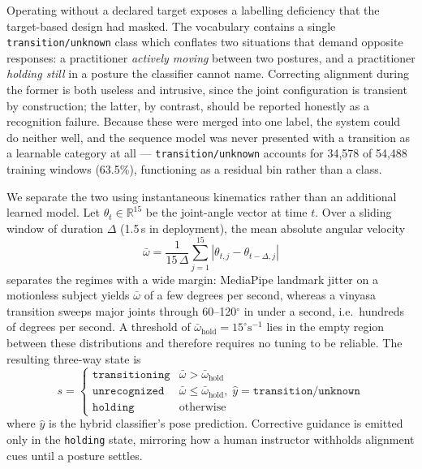 \documentclass[conference]{IEEEtran}
\begin{document}
Operating without a declared target exposes a labelling deficiency that the
target-based design had masked. The vocabulary contains a single
\texttt{transition/unknown} class which conflates two situations that demand
opposite responses: a practitioner \emph{actively moving} between two
postures, and a practitioner \emph{holding still} in a posture the classifier
cannot name. Correcting alignment during the former is both useless and
intrusive, since the joint configuration is transient by construction; the
latter, by contrast, should be reported honestly as a recognition failure.
Because these were merged into one label, the system could do neither well,
and the sequence model was never presented with a transition as a learnable
category at all --- \texttt{transition/unknown} accounts for
34{,}578 of 54{,}488 training windows (63.5\%), functioning as a residual bin
rather than a class.

We separate the two using instantaneous kinematics rather than an additional
learned model. Let $\theta_t \in \mathbb{R}^{15}$ be the joint-angle vector at
time $t$. Over a sliding window of duration $\Delta$ (1.5\,s in deployment),
the mean absolute angular velocity
\begin{equation}
\bar{\omega} = \frac{1}{15\,\Delta} \sum_{j=1}^{15}
\left| \theta_{t,j} - \theta_{t-\Delta,j} \right|
\label{eq:motion}
\end{equation}
separates the regimes with a wide margin: MediaPipe landmark jitter on a
motionless subject yields $\bar{\omega}$ of a few degrees per second, whereas a
vinyasa transition sweeps major joints through 60--120$^\circ$ in under a
second, i.e.\ hundreds of degrees per second. A threshold of
$\bar{\omega}_{\mathrm{hold}} = 15^{\circ}\mathrm{s}^{-1}$ lies in the empty
region between these distributions and therefore requires no tuning to be
reliable. The resulting three-way state is
\begin{equation}
s =
\begin{cases}
\texttt{transitioning} & \bar{\omega} > \bar{\omega}_{\mathrm{hold}} \\
\texttt{unrecognized} & \bar{\omega} \le \bar{\omega}_{\mathrm{hold}},\;
                        \hat{y} = \texttt{transition/unknown} \\
\texttt{holding} & \text{otherwise}
\end{cases}
\label{eq:motionstate}
\end{equation}
where $\hat{y}$ is the hybrid classifier's pose prediction. Corrective
guidance is emitted only in the \texttt{holding} state, mirroring how a human
instructor withholds alignment cues until a posture settles.
\end{document}
